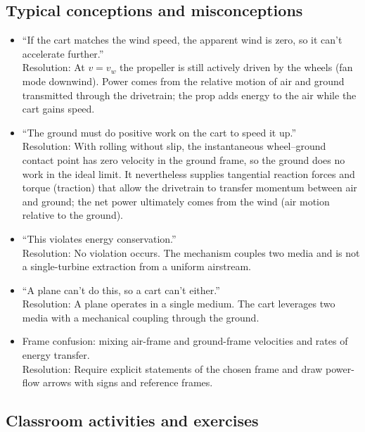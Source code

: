 \documentclass[reprint,aps,pra,longbibliography]{revtex4-2}
\begin{document}
\subsection{Typical conceptions and misconceptions}
\label{sec:misconceptions}

\begin{itemize}
\item ``If the cart matches the wind speed, the apparent wind is zero, so it can't accelerate further.''
\\Resolution: At $v=v_w$ the propeller is still actively driven by the wheels (fan mode downwind). Power comes from the relative motion of air and ground transmitted through the drivetrain; the prop adds energy to the air while the cart gains speed.

\item ``The ground must do positive work on the cart to speed it up.''
\\Resolution: With rolling without slip, the instantaneous wheel--ground contact point has zero velocity in the ground frame, so the ground does no work in the ideal limit. It nevertheless supplies tangential reaction forces and torque (traction) that allow the drivetrain to transfer momentum between air and ground; the net power ultimately comes from the wind (air motion relative to the ground).

\item ``This violates energy conservation.''
\\Resolution: No violation occurs. The mechanism couples two media and is not a single-turbine extraction from a uniform airstream.

\item ``A plane can't do this, so a cart can't either.''
\\Resolution: A plane operates in a single medium. The cart leverages two media with a mechanical coupling through the ground.

\item Frame confusion: mixing air-frame and ground-frame velocities and rates of energy transfer.
\\Resolution: Require explicit statements of the chosen frame and draw power-flow arrows with signs and reference frames.
\end{itemize}

\subsection{Classroom activities and exercises}
\end{document}
